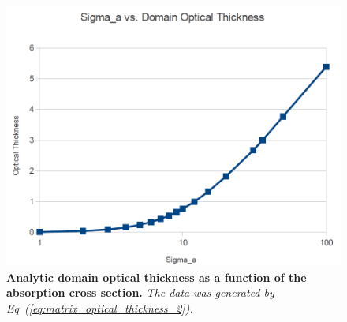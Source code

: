\documentclass[letterpaper,12pt]{article}
\begin{document}
\begin{figure}[t!]
  \begin{center}
    \includegraphics[width=5in,clip]{optical_thickness.png}
  \end{center}
  \caption{\textbf{Analytic domain optical thickness as a function of
      the absorption cross section.} \textit{The data was
      generated by Eq~(\ref{eq:matrix_optical_thickness_2}).}}
  \label{fig:optical_thickness}
\end{figure}
\end{document}
